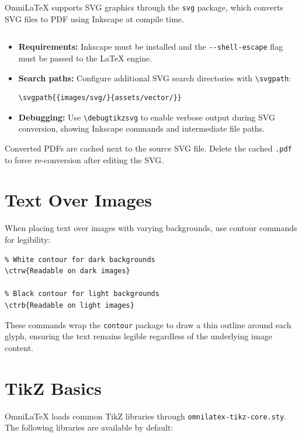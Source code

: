 OmniLaTeX supports SVG graphics through the \texttt{svg} package, which
converts SVG files to PDF using Inkscape at compile time.

\begin{verbatim}

\end{verbatim}

\begin{itemize}
    \item \textbf{Requirements:} Inkscape must be installed and the
          \texttt{-{}-shell-escape} flag must be passed to the \LaTeX{}
          engine.
    \item \textbf{Search paths:} Configure additional SVG search directories
          with \verb|\svgpath|:
\begin{verbatim}
\svgpath{{images/svg/}{assets/vector/}}
\end{verbatim}
    \item \textbf{Debugging:} Use \verb|\debugtikzsvg| to enable verbose
          output during SVG conversion, showing Inkscape commands and
          intermediate file paths.
\end{itemize}

Converted PDFs are cached next to the source SVG file. Delete the cached
\texttt{.pdf} to force re-conversion after editing the SVG.

\section{Text Over Images}

When placing text over images with varying backgrounds, use contour commands
for legibility:

\begin{verbatim}
% White contour for dark backgrounds
\ctrw{Readable on dark images}

% Black contour for light backgrounds
\ctrb{Readable on light images}
\end{verbatim}

These commands wrap the \texttt{contour} package to draw a thin outline around
each glyph, ensuring the text remains legible regardless of the underlying
image content.

\section{TikZ Basics}

OmniLaTeX loads common TikZ libraries through
\texttt{omnilatex-tikz-core.sty}. The following libraries are available by
default:

